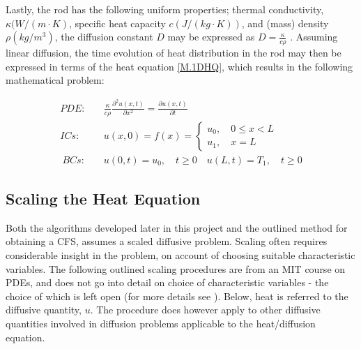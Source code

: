 \documentclass[%
oneside,                 %
final,                   %
10pt]{article}
\begin{document}
Lastly, the rod has the following uniform properties; thermal conductivity, $\kappa(W/(m\cdot K)$, specific heat capacity $c(J/(kg \cdot K))$, and (mass) density $\rho(kg/m^3)$, the diffusion constant $D$ may be expressed as $D=\frac{\kappa}{c \rho}$ \citep[p.304]{HJ15}. Assuming linear diffusion, the time evolution of heat distribution in the rod may then be expressed in terms of the heat equation \eqref{M.1DHQ}, which results in the following mathematical problem:

\begin{align}
PDE:&\quad \frac{\kappa}{c \rho}\frac{\partial^2 u(x,t)}{\partial x^2}=\frac{\partial u(x,t)}{\partial t} \label{eq:rod}\\
ICs:&\quad u(x,0)=f(x)=  \begin{cases}
  u_0, \quad 0\leq x < L\\
 u_1, \quad x=L
  \end{cases} \label{eq:rodIC}\\\
BCs:& \quad u(0,t)=u_0, \quad t \geq 0 \quad u(L,t)=T_1, \quad t \geq 0 \label{eq:rodBC}
\end{align}


\subsection{Scaling the Heat Equation}
Both the algorithms developed later in this project and the outlined method for obtaining a CFS, assumes a scaled diffusive problem. Scaling often requires considerable insight in the problem, on account of choosing suitable characteristic variables. The following outlined scaling procedures are from an MIT course on PDEs, and does not go into detail on choice of characteristic variables - the choice of which is left open (for more details see \cite{Hancock}). Below, heat is referred to the diffusive quantity, $u$. The procedure does however apply to other diffusive quantities involved in diffusion problems applicable to the heat/diffusion equation. \newline
\end{document}
